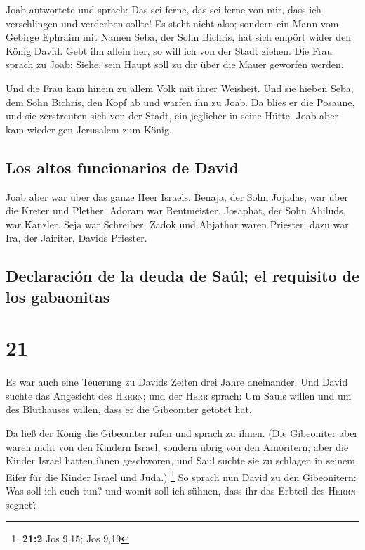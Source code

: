  Joab antwortete und sprach: Das sei ferne, das sei ferne
von mir, dass ich verschlingen und verderben sollte! Es steht nicht
also;  sondern ein Mann vom Gebirge Ephraim mit Namen
Seba, der Sohn Bichris, hat sich empört wider den König David. Gebt ihn
allein her, so will ich von der Stadt ziehen. Die Frau sprach zu Joab:
Siehe, sein Haupt soll zu dir über die Mauer geworfen werden.

 Und die Frau kam hinein zu allem Volk mit ihrer
Weisheit. Und sie hieben Seba, dem Sohn Bichris, den Kopf ab und warfen
ihn zu Joab. Da blies er die Posaune, und sie zerstreuten sich von der
Stadt, ein jeglicher in seine Hütte. Joab aber kam wieder gen Jerusalem
zum König.

\hypertarget{los-altos-funcionarios-de-david}{%
\subsection{Los altos funcionarios de
David}\label{los-altos-funcionarios-de-david}}

 Joab aber war über das ganze Heer Israels. Benaja, der
Sohn Jojadas, war über die Kreter und Plether.  Adoram
war Rentmeister. Josaphat, der Sohn Ahiluds, war Kanzler.
 Seja war Schreiber. Zadok und Abjathar waren Priester;
 dazu war Ira, der Jairiter, Davids Priester.

\hypertarget{declaraciuxf3n-de-la-deuda-de-sauxfal-el-requisito-de-los-gabaonitas}{%
\subsection{Declaración de la deuda de Saúl; el requisito de los
gabaonitas}\label{declaraciuxf3n-de-la-deuda-de-sauxfal-el-requisito-de-los-gabaonitas}}

\hypertarget{section-20}{%
\section{21}\label{section-20}}

 Es war auch eine Teuerung zu Davids Zeiten drei Jahre
aneinander. Und David suchte das Angesicht des \textsc{Herrn}; und der
\textsc{Herr} sprach: Um Sauls willen und um des Bluthauses willen, dass
er die Gibeoniter getötet hat.

 Da ließ der König die Gibeoniter rufen und sprach zu
ihnen. (Die Gibeoniter aber waren nicht von den Kindern Israel, sondern
übrig von den Amoritern; aber die Kinder Israel hatten ihnen geschworen,
und Saul suchte sie zu schlagen in seinem Eifer für die Kinder Israel
und Juda.) \footnote{\textbf{21:2} Jos 9,15; Jos 9,19}  So
sprach nun David zu den Gibeonitern: Was soll ich euch tun? und womit
soll ich sühnen, dass ihr das Erbteil des \textsc{Herrn} segnet?

